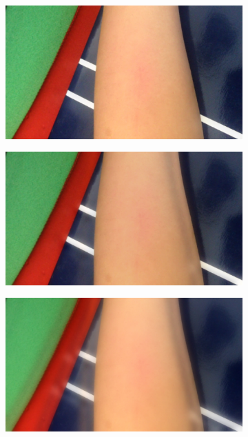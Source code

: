 \begin{figure}[!h]
\centering
\begin{subfigure}{.3\textwidth}
  \centering
  \includegraphics[scale=0.08]{img/eulerian/test/handc1}
  \label{fig:sub2}
\end{subfigure}%
\begin{subfigure}{.3\textwidth}
  \centering
  \includegraphics[scale=0.08]{img/eulerian/test/handc2}
  \label{fig:sub2}
\end{subfigure}
\begin{subfigure}{.3\textwidth}
  \centering
  \includegraphics[scale=0.08]{img/eulerian/test/handc3}

\end{subfigure}
\end{figure}
